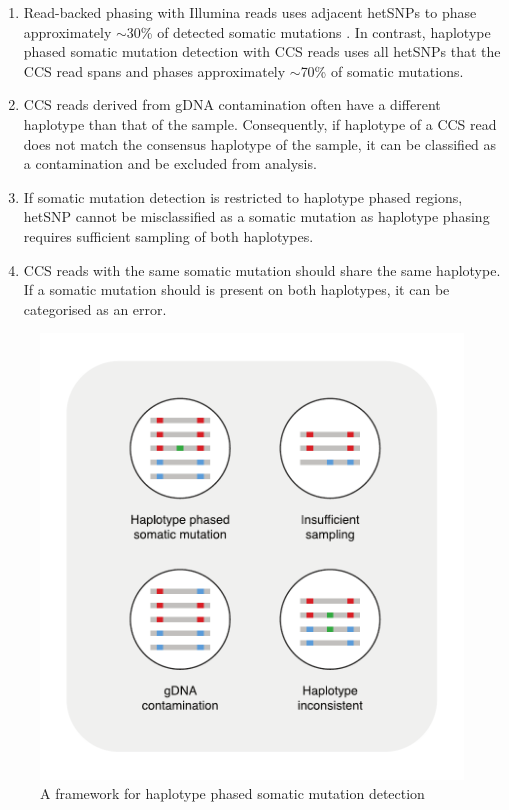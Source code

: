\begin{enumerate}
\item Read-backed phasing with Illumina reads uses adjacent hetSNPs to phase approximately $\sim$30\% of detected somatic mutations \cite{Nik-Zainal2012-nz}. In contrast, haplotype phased somatic mutation detection with CCS reads uses all hetSNPs that the CCS read spans and phases approximately $\sim$70\% of somatic mutations.
\item CCS reads derived from gDNA contamination often have a different haplotype than that of the sample. Consequently, if haplotype of a CCS read does not match the consensus haplotype of the sample, it can be classified as a contamination and be excluded from analysis.
\item If somatic mutation detection is restricted to haplotype phased regions, hetSNP cannot be misclassified as a somatic mutation as haplotype phasing requires sufficient sampling of both haplotypes.
\item CCS reads with the same somatic mutation should share the same haplotype. If a somatic mutation should is present on both haplotypes, it can be categorised as an error.
\end{enumerate}

\begin{figure}[htbp!]
\caption{A framework for haplotype phased somatic mutation detection}
\label{figure:haplotype-phased-somatic-mutation-detection}
\begin{centering}
\includegraphics[width=\textwidth]{Vector/haplotype_phased_somatic_mutation_detection.pdf}
\end{centering}
\end{figure}

